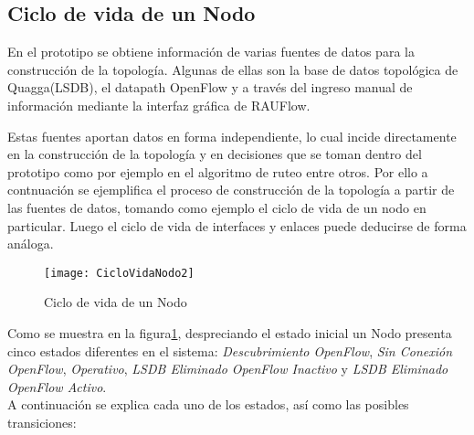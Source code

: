 \subsection{Ciclo de vida de un Nodo}

En el prototipo se obtiene informaci\'on de varias fuentes de datos para la construcci\'on de la topolog\'ia. Algunas de ellas son la base de datos topol\'ogica de Quagga(LSDB), el datapath OpenFlow y a través del ingreso manual de informaci\'on mediante la interfaz gr\'afica de RAUFlow.

Estas fuentes aportan datos en forma independiente, lo cual incide directamente en la construcci\'on de la topolog\'ia y en decisiones que se toman dentro del prototipo como por ejemplo en el algoritmo de ruteo entre otros. Por ello a contnuaci\'on se ejemplifica el proceso de construcci\'on de la topolog\'ia a partir de las fuentes de datos, tomando como ejemplo el ciclo de vida de un nodo en particular. Luego el ciclo de vida de interfaces y enlaces puede deducirse de forma análoga.\\

\begin{figure}[ht!] 
\centering    
\texttt{[image: CicloVidaNodo2]}
\caption[Ciclo de vida de un Nodo]{Ciclo de vida de un Nodo}
\label{fig:CicloVidaNodo}
\end{figure}
  
Como se muestra en la figura\ref{fig:CicloVidaNodo}, despreciando el estado inicial un Nodo presenta cinco estados diferentes en el sistema: \textit{Descubrimiento OpenFlow}, \textit{Sin Conexión OpenFlow}, \textit{Operativo}, \textit{LSDB Eliminado OpenFlow Inactivo} y \textit{LSDB Eliminado OpenFlow Activo}.\\

A continuación se explica cada uno de los estados, así como las posibles transiciones:


